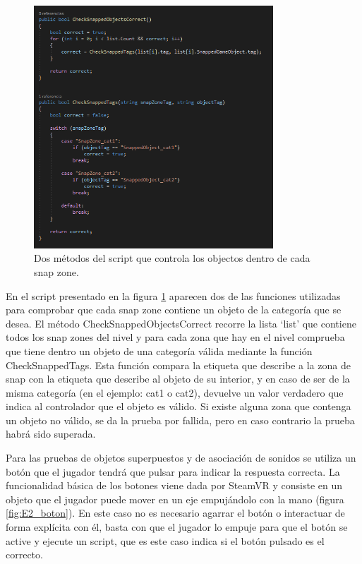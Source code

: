\begin{figure}
  \centering
    \includegraphics[width=0.8\textwidth]{04.Desarrollo/02.Entrega2/02.Iteracion2_2/00.Figuras/07.script_snap.png}
    \caption{Dos métodos del script que controla los objectos dentro de cada snap zone.}
    \label{fig:E2_scriptSnap}
\end{figure}

En el script presentado en la figura \ref{fig:E2_scriptSnap} aparecen dos de las funciones utilizadas para comprobar que cada snap zone contiene un objeto de la categoría que se desea. El método CheckSnappedObjectsCorrect recorre la lista ‘list’ que contiene todos los snap zones del nivel y para cada zona que hay en el nivel comprueba que tiene dentro un objeto de una categoría válida mediante la función CheckSnappedTags. Esta función compara la etiqueta que describe a la zona de snap con la etiqueta que describe al objeto de su interior, y en caso de ser de la misma categoría (en el ejemplo: cat1 o cat2), devuelve un valor verdadero que indica al controlador que el objeto es válido. Si existe alguna zona que contenga un objeto no válido, se da la prueba por fallida, pero en caso contrario la prueba habrá sido superada.

Para las pruebas de objetos superpuestos y de asociación de sonidos se utiliza un botón que el jugador tendrá que pulsar para indicar la respuesta correcta. La funcionalidad básica de los botones viene dada por SteamVR y consiste en un objeto que el jugador puede mover en un eje empujándolo con la mano (figura \ref{fig:E2_boton}). En este caso no es necesario agarrar el botón o interactuar de forma explícita con él, basta con que el jugador lo empuje para que el botón se active y ejecute un script, que es este caso indica si el botón pulsado es el correcto.


